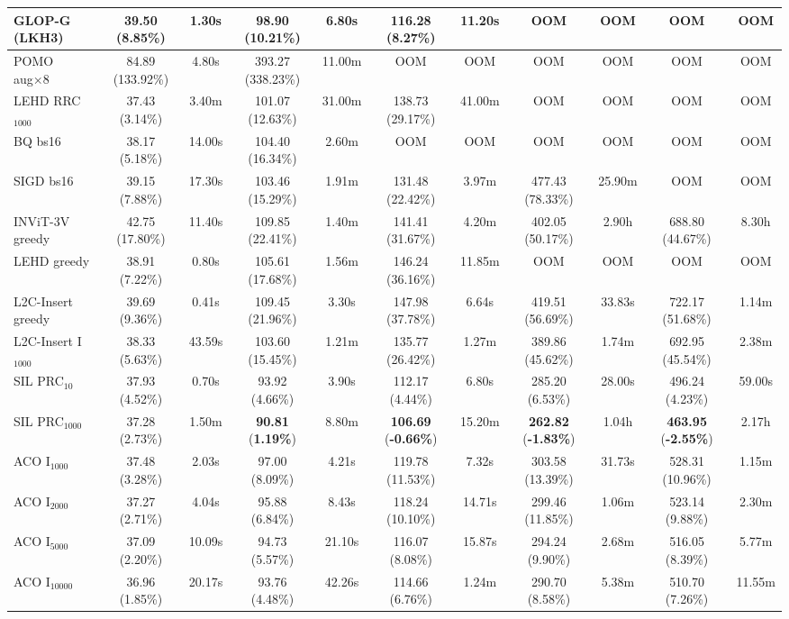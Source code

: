 \documentclass[sigconf,review]{acmart}
\begin{document}
\begin{table}[t]
{\begin{tabular}{lcccccccccc}
GLOP-G (LKH3) & 39.50 (8.85\%) & 1.30s & 98.90 (10.21\%) & 6.80s & 116.28 (8.27\%) & 11.20s & OOM & OOM & OOM & OOM \\
\midrule
POMO aug×8 & 84.89 (133.92\%) & 4.80s & 393.27 (338.23\%) & 11.00m & OOM & OOM & OOM & OOM & OOM & OOM \\
LEHD RRC$_{1000}$ & 37.43 (3.14\%) & 3.40m & 101.07 (12.63\%) & 31.00m & 138.73 (29.17\%) & 41.00m & OOM & OOM & OOM & OOM \\
BQ bs16 & 38.17 (5.18\%) & 14.00s & 104.40 (16.34\%) & 2.60m & OOM & OOM & OOM & OOM & OOM & OOM \\
SIGD bs16 & 39.15 (7.88\%) & 17.30s & 103.46 (15.29\%) & 1.91m & 131.48 (22.42\%) & 3.97m & 477.43 (78.33\%) & 25.90m & OOM & OOM \\
INViT-3V greedy & 42.75 (17.80\%) & 11.40s & 109.85 (22.41\%) & 1.40m & 141.41 (31.67\%) & 4.20m & 402.05 (50.17\%) & 2.90h & 688.80 (44.67\%) & 8.30h \\
LEHD greedy & 38.91 (7.22\%) & 0.80s & 105.61 (17.68\%) & 1.56m & 146.24 (36.16\%) & 11.85m & OOM & OOM & OOM & OOM \\
L2C-Insert greedy & 39.69 (9.36\%) & 0.41s & 109.45 (21.96\%) & 3.30s & 147.98 (37.78\%) & 6.64s & 419.51 (56.69\%) & 33.83s & 722.17 (51.68\%) & 1.14m \\
L2C-Insert I$_{1000}$ & 38.33 (5.63\%) & 43.59s & 103.60 (15.45\%) & 1.21m & 135.77 (26.42\%) & 1.27m & 389.86 (45.62\%) & 1.74m & 692.95 (45.54\%) & 2.38m \\
SIL PRC$_{10}$ & 37.93 (4.52\%) & 0.70s & 93.92 (4.66\%) & 3.90s & 112.17 (4.44\%) & 6.80s & 285.20 (6.53\%) & 28.00s & 496.24 (4.23\%) & 59.00s \\
SIL PRC$_{1000}$ & 37.28 (2.73\%) & 1.50m & \textbf{90.81} (\textbf{1.19\%}) & 8.80m & \textbf{106.69} (\textbf{-0.66\%}) & 15.20m & \textbf{262.82} (\textbf{-1.83\%}) & 1.04h & \textbf{463.95} (\textbf{-2.55\%}) & 2.17h \\
\midrule
ACO I$_{1000}$ & 37.48 (3.28\%) & 2.03s & 97.00 (8.09\%) & 4.21s & 119.78 (11.53\%) & 7.32s & 303.58 (13.39\%) & 31.73s & 528.31 (10.96\%) & 1.15m \\
ACO I$_{2000}$ & 37.27 (2.71\%) & 4.04s & 95.88 (6.84\%) & 8.43s & 118.24 (10.10\%) & 14.71s & 299.46 (11.85\%) & 1.06m & 523.14 (9.88\%) & 2.30m \\
ACO I$_{5000}$ & 37.09 (2.20\%) & 10.09s & 94.73 (5.57\%) & 21.10s & 116.07 (8.08\%) & 15.87s & 294.24 (9.90\%) & 2.68m & 516.05 (8.39\%) & 5.77m \\
ACO I$_{10000}$ & 36.96 (1.85\%) & 20.17s & 93.76 (4.48\%) & 42.26s & 114.66 (6.76\%) & 1.24m & 290.70 (8.58\%) & 5.38m & 510.70 (7.26\%) & 11.55m \\

\end{tabular}}
\end{table}
\end{document}
